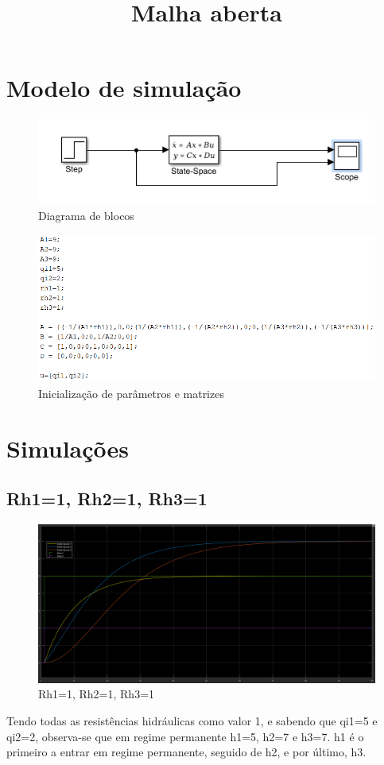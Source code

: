 \documentclass[11pt]{article}
\begin{document}
\title{Malha aberta}
\maketitle

\section{Modelo de simulação}
\begin{figure}[!h]
\begin{center}
\includegraphics[width=12cm]{modelo.PNG}
\caption{Diagrama de blocos}
\label{fig1.1}
\end{center}
\end{figure}
\begin{figure}[!h]
\includegraphics[width=15cm]{params.png}
\caption{Inicialização de parâmetros e matrizes}
\label{fig1.2}
\end{figure}

\pagebreak
\section{Simulações}
\subsection{Rh1=1, Rh2=1, Rh3=1}
\begin{figure}[!h]
\includegraphics[width=16cm]{initial.png}
\caption{Rh1=1, Rh2=1, Rh3=1}
\label{fig2.1}
\end{figure}
Tendo todas as resistências hidráulicas como valor 1, e sabendo que qi1=5 e qi2=2, observa-se que em regime permanente h1=5, h2=7 e h3=7. h1 é o primeiro a entrar em regime permanente, seguido de h2, e  por último, h3.
\pagebreak
\end{document}
